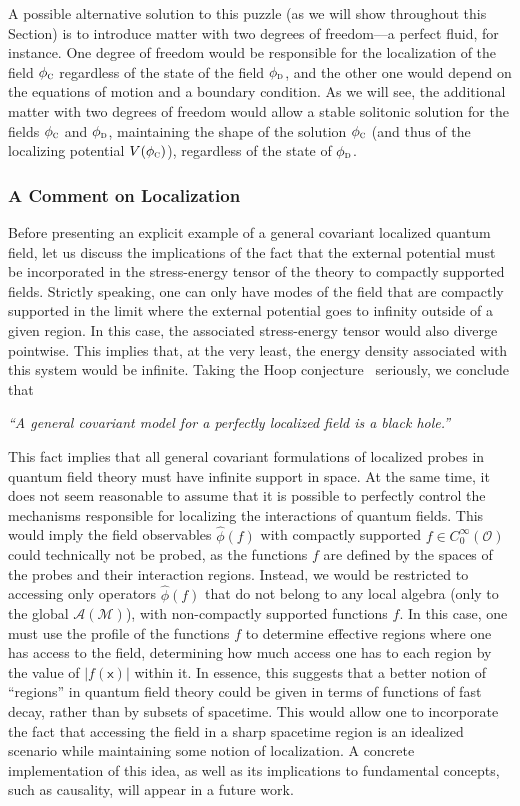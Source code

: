 \documentclass[letterpaper,12pt,titlepage,oneside,final]{book}
\newcommand{\M}{\mathcal{M}}
\newcommand{\mf}{\mathsf}%
\newcommand{\tc}[1]{\textsc{#1}}
\begin{document}
A possible alternative solution to this puzzle (as we will show throughout this Section) is to introduce matter with two degrees of freedom---a perfect fluid, for instance. One degree of freedom would be responsible for the localization of the field $\phi_{\tc{c}}$ regardless of the state of the field $\phi_\tc{d}$, and the other one would depend on the equations of motion and a boundary condition. As we will see, the additional matter with two degrees of freedom would allow a stable solitonic solution for the fields $\phi_\tc{c}$ and $\phi_\tc{d}$, maintaining the shape of the solution $\phi_\tc{c}$ (and thus of the localizing potential $V(\phi_\tc{c})$), regardless of the state of $\phi_\tc{d}$.

\subsubsection*{A Comment on Localization}

Before presenting an explicit example of a general covariant localized quantum field, let us discuss the implications of the fact that the external potential must be incorporated in the stress-energy tensor of the theory to compactly supported fields. Strictly speaking, one can only have modes of the field that are compactly supported in the limit where the external potential goes to infinity outside of a given region. In this case, the associated stress-energy tensor would also diverge pointwise. This implies that, at the very least, the energy density associated with this system would be infinite. Taking the Hoop conjecture~\cite{hoopConj,HoopReview} seriously, we conclude that
\begin{center}
    \textit{``A general covariant model for a perfectly localized field is a black hole.''}
\end{center}
\noindent This fact implies that all general covariant formulations of localized probes in quantum field theory must have infinite support in space. At the same time, it does not seem reasonable to assume that it is possible to perfectly control the mechanisms responsible for localizing the interactions of quantum fields. This would imply the field observables $\hat{\phi}(f)$ with compactly supported $f\in C_0^\infty(\mathcal{O})$ could technically not be probed, as the functions $f$ are defined by the spaces of the probes and their interaction regions. Instead, we would be restricted to accessing only operators $\hat{\phi}(f)$ that do not belong to any local algebra (only to the global $\mathcal{A}(\M)$), with non-compactly supported functions $f$. In this case, one must use the profile of the functions $f$ to determine effective regions where one has access to the field, determining how much access one has to each region by the value of $|f(\mf x)|$ within it. In essence, this suggests that a better notion of ``regions'' in quantum field theory could be given in terms of functions of fast decay, rather than by subsets of spacetime. This would allow one to incorporate the fact that accessing the field in a sharp spacetime region is an idealized scenario while maintaining some notion of localization. A concrete implementation of this idea, as well as its implications to fundamental concepts, such as causality, will appear in a future work.
\end{document}

